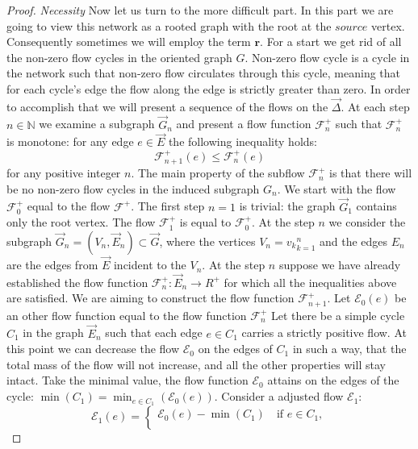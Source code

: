 \documentclass[12pt]{article}
\renewcommand{\cal}[1]{\mathcal{#1}}
\renewcommand{\leq}{\leqslant}
\theoremstyle{definition}
\newcommand{\flowpos}{\mathcal{F}^{+}}
\newcommand{\flowposn}[1]{\mathcal{F}_{#1}^{+}}
\newcommand{\source}{\mathit{source}}
\renewcommand{\root}{\mathbf{r}}
\newcommand{\onet}{\vec{\Delta}}
\numberwithin{remark}{section}
\numberwithin{theorem}{section}
\numberwithin{prop}{section}
\numberwithin{equation}{section}
\numberwithin{lemma}{section}
\numberwithin{prop_under_lemma}{lemma}
\begin{document}
\begin{proof}
      \noindent\textit{Necessity}
      Now let us turn to the more difficult part.
      In this part we are going to view this network as a rooted graph with the root at the $\source$ vertex.
      Consequently sometimes we will employ the term $\root$.
      For a start we get rid of all the non-zero flow cycles in the oriented graph $G$.
      Non-zero flow cycle is a cycle in the network such that non-zero flow circulates through this cycle,
      meaning that for each cycle's edge the flow along the edge is strictly greater than zero.
      In order to accomplish that we will present a sequence of the flows on the $\onet$.
      At each step $n \in \mathbb{N}$ we examine a subgraph $\vec{G}_n$ and present a flow function $\flowposn{n}$
        such that $\flowposn{n}$ is monotone: for any edge $e \in \vec{E}$ the following inequality holds:
      \[
        \flowposn{n+1}(e) \leq \flowposn{n}(e)
      \]
      for any positive integer $n$.
      The main property of the subflow $\flowposn{n}$ is that there will be no non-zero flow cycles in the induced subgraph
      $G_n$.
      We start with the flow $\flowposn{0}$ equal to the flow $\flowpos$.
      The first step $n = 1$ is trivial: the graph $\vec{G}_1$ contains only the root vertex.
      The flow $\flowposn{1}$ is equal to $\flowposn{0}$.
      At the step $n$ we consider the subgraph $\vec{G}_n = (V_n, \vec{E}_n) \subset \vec{G}$, where the vertices
        $V_n = {v_k}_{k=1}^n$ and the edges $E_n$ are the edges from $\vec{E}$ incident to the $V_n$.
      At the step $n$ suppose we have already established the flow function $\flowposn{n}: \vec{E}_{n} \to R^{+}$ for which
        all the inequalities above are satisfied.
      We are aiming to construct the flow function $\flowposn{n+1}$.
      Let $\cal{E}_0(e)$ be an other flow function  equal to the flow function $\flowposn{n}$
      Let there be a simple cycle $C_1$ in the graph $\vec{E}_n$ such that each edge $e \in C_1$ carries
        a strictly positive flow.
      At this point we can decrease the flow $\cal{E}_0$ on the edges of $C_1$ in such a way, that the total mass
        of the flow will not increase, and all the other properties will stay intact.
      Take the minimal value, the flow function $\cal{E}_0$
        attains on the edges of the cycle: $\displaystyle\min(C_1) = \min_{e \in C_1}\left(\cal{E}_0(e)\right)$.
      Consider a adjusted flow $\cal{E}_1$:
      \begin{equation*}
        \cal{E}_1(e) =
        \begin{cases}
          \cal{E}_0(e) - \min(C_1) \quad \text{if } e \in C_1,\\

\end{cases}
\end{equation*}
\end{proof}
\end{document}
